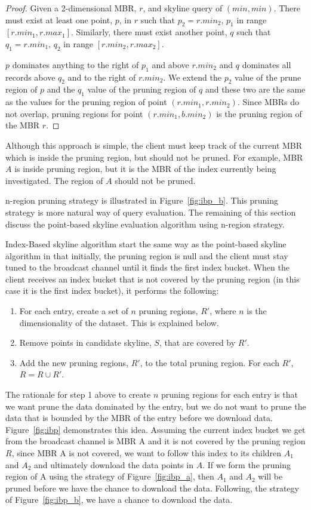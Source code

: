 \begin{proof}
Given a 2-dimensional MBR, $r$, and skyline query of $(min, min)$.
There must exist at least one point, $p$,
in $r$ such that $p_2 = r.min_2$, $p_1$ in range
$[r.min_1, r.max_1]$. Similarly, there must exist another
point, $q$ such that $q_1 = r.min_1$, $q_2$ in range
$[r.min_2, r.max_2]$.

$p$ dominates anything to the right of $p_1$ and above
$r.min_2$ and $q$ dominates all records above $q_2$ and to
the right of $r.min_2$. We extend the $p_2$ value of the prune
region of $p$ and the $q_1$ value of the pruning region of $q$
and these two are the same as the values for the pruning region of
point $(r.min_1, r.min_2)$. Since MBRs do not overlap, pruning
regions for point $(r.min_1, b.min_2)$ is the pruning region
of the MBR $r$.
\end{proof}
Although this approach is simple, the client must keep track of the
current MBR which is inside the pruning region, but should not be
pruned. For example, MBR $A$ is inside pruning region, but it is the
MBR of the index currently being investigated. The region of $A$
should not be pruned.


n-region pruning strategy is illustrated in Figure~\ref{fig:ibp_b}.
This pruning strategy is more natural way of query evaluation. The
remaining of this section discuss the point-based skyline evaluation
algorithm using n-region strategy.

Index-Based skyline algorithm start the same way as the point-based
skyline algorithm in that initially, the pruning region is null and
the client must stay tuned to the broadcast channel until it finds
the first index bucket. When the client receives an index bucket that
is not covered by the pruning region (in this case it is the first
index bucket), it performs the following:
\begin{enumerate}
\item For each entry, create a set of $n$ pruning regions, $R'$,
    where $n$ is the dimensionality of the dataset. This is explained
    below.
\item Remove points in candidate skyline, $S$, that are covered by
    $R'$.
\item Add the new pruning regions, $R'$, to the total pruning region.
    For each $R'$, $R = R \cup R'$.
\end{enumerate}
The rationale for step 1 above to create $n$ pruning regions for each
entry is that we want prune the data dominated by the entry, but we
do not want to prune the data that is bounded by the MBR of the entry
before we download data. Figure~\ref{fig:ibp}
demonstrates this idea. Assuming the current index bucket we get from the
broadcast channel is MBR A and it is not covered by the pruning region
$R$, since MBR A is not covered, we want to follow this index to its
children $A_1$ and $A_2$ and ultimately download the data points in $A$. If we
form the pruning region of A using the strategy of Figure~\ref{fig:ibp_a},
then $A_1$ and $A_2$ will be pruned before we have the chance to download the
data. Following, the strategy of Figure~\ref{fig:ibp_b}, we have a chance
to download the data.

